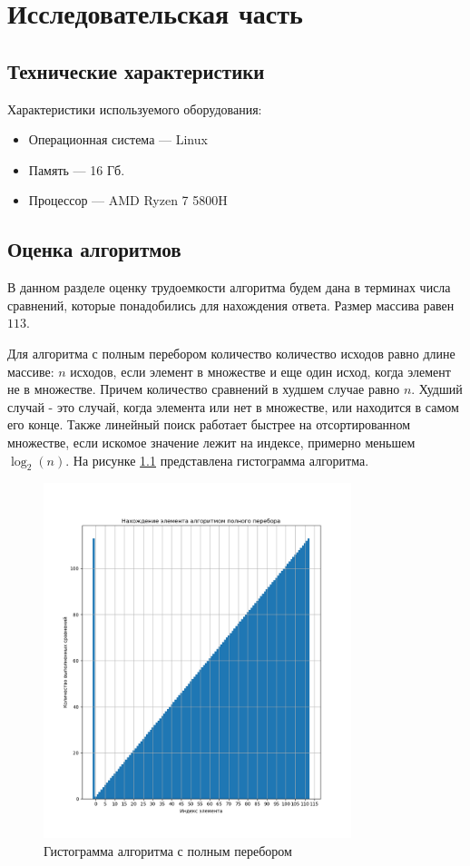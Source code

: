 \chapter{Исследовательская часть}

\section{Технические характеристики}
Характеристики используемого оборудования:
\begin{itemize}
    \item Операционная система --- Linux \cite{bib5}
    \item Память --- 16 Гб.
    \item Процессор --- AMD Ryzen 7 5800H \cite{bib6}
\end{itemize}

\section{Оценка алгоритмов}
В данном разделе оценку трудоемкости алгоритма будем дана в терминах числа сравнений, которые понадобились
для нахождения ответа. Размер массива равен $113$.

\medskip

Для алгоритма с полным перебором количество количество исходов равно длине массиве:
$n$ исходов, если элемент в множестве и еще один исход, когда элемент не в множестве.
Причем количество сравнений в худшем случае равно  $n$. Худший случай - это случай, когда
элемента или нет в множестве, или находится в самом его конце. Также
линейный поиск работает быстрее на отсортированном множестве, если
искомое значение лежит на индексе, примерно меньшем $\log_2(n)$. На рисунке
\ref{fig:images-Figure_1} представлена гистограмма алгоритма.

\begin{figure}[h]
    \centering
    \includegraphics[width=0.8\textwidth]{images/Figure_1}
    \caption{Гистограмма алгоритма с полным перебором}
    \label{fig:images-Figure_1}
\end{figure}

